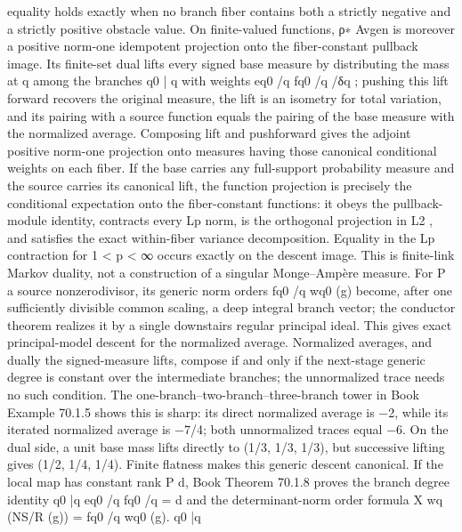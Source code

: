 \documentclass[11pt]{article}
\begin{document}
\begin{OriginalTaskDATA}
equality holds exactly when no branch ﬁber contains both a strictly negative and a strictly
positive obstacle value. On ﬁnite-valued functions, ρ∗ Avgen is moreover a positive norm-one
idempotent projection onto the ﬁber-constant pullback image. Its ﬁnite-set dual lifts every
signed base measure by distributing the mass at q among the branches q0 | q with weights
eq0 /q fq0 /q /δq ; pushing this lift forward recovers the original measure, the lift is an isometry
for total variation, and its pairing with a source function equals the pairing of the base
measure with the normalized average. Composing lift and pushforward gives the adjoint
positive norm-one projection onto measures having those canonical conditional weights on
each ﬁber. If the base carries any full-support probability measure and the source carries
its canonical lift, the function projection is precisely the conditional expectation onto the
ﬁber-constant functions: it obeys the pullback-module identity, contracts every Lp norm, is
the orthogonal projection in L2 , and satisﬁes the exact within-ﬁber variance decomposition.
Equality in the Lp contraction for 1 < p < ∞ occurs exactly on the descent image. This
is ﬁnite-link Markov duality, not a construction of a singular Monge–Ampère measure. For
                                                        P
a source nonzerodivisor, its generic norm orders           fq0 /q wq0 (g) become, after one suﬃciently
divisible common scaling, a deep integral branch vector; the conductor theorem realizes it
by a single downstairs regular principal ideal. This gives exact principal-model descent for
the normalized average. Normalized averages, and dually the signed-measure lifts, compose
if and only if the next-stage generic degree is constant over the intermediate branches; the
unnormalized trace needs no such condition. The one-branch–two-branch–three-branch tower
in Book Example 70.1.5 shows this is sharp: its direct normalized average is −2, while its
iterated normalized average is −7/4; both unnormalized traces equal −6. On the dual side, a
unit base mass lifts directly to (1/3, 1/3, 1/3), but successive lifting gives (1/2, 1/4, 1/4).
     Finite ﬂatness makes this generic descent canonical. If the local map has constant rank
                                                                          P
d, Book Theorem 70.1.8 proves the branch degree identity                    q0 |q eq0 /q fq0 /q = d and the
determinant-norm order formula
                                                           X
                                    wq (NS/R (g)) =                fq0 /q wq0 (g).
                                                           q0 |q


\end{OriginalTaskDATA}
\end{document}
